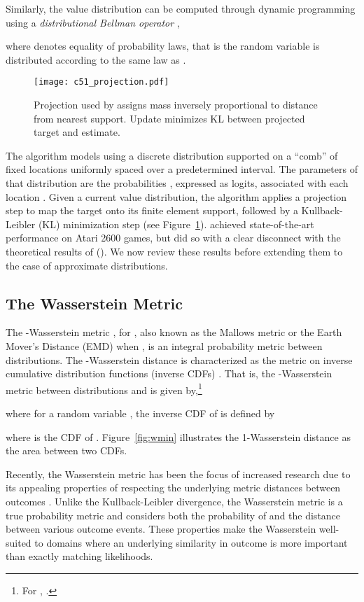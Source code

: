 \documentclass[letterpaper]{article}
\newcommand{\citet}[1]{\citeauthor{#1} (\citeyear{#1})}
\begin{document}
Similarly, the value distribution can be computed through dynamic programming using a \textit{distributional Bellman operator} \cite{c51},

where  denotes equality of probability laws, that is the random variable  is distributed according to the same law as .

\begin{figure}[t]
\begin{center}
\texttt{[image: c51\_projection.pdf]}
\end{center}
\caption{Projection used by  assigns mass inversely proportional to distance from nearest support. Update minimizes KL between projected target and estimate.\label{fig:c51proj}}
\end{figure}

The  algorithm models  using a discrete distribution supported on a ``comb'' of fixed locations  uniformly spaced over a predetermined interval. The parameters of that distribution are the probabilities , expressed as logits, associated with each location . Given a current value distribution, the  algorithm applies a projection step  to map the target  onto its finite element support, followed by a Kullback-Leibler (KL) minimization step (see Figure~\ref{fig:c51proj}).  achieved state-of-the-art performance on Atari 2600 games, but did so with a clear disconnect with the theoretical results of \citet{c51}. We now review these results before extending them to the case of approximate distributions.

\subsection{The Wasserstein Metric}

The -Wasserstein metric , for , also known as the Mallows metric \cite{bickel81asymptotic} or the Earth Mover's Distance (EMD) when  \cite{levina2001earth}, is an integral probability metric between distributions.
The -Wasserstein distance is characterized as the  metric on inverse cumulative distribution functions (inverse CDFs) \cite{muller1997integral}. That is, the -Wasserstein metric between distributions  and  is given by,\footnote{For , .}

where for a random variable , the inverse CDF  of  is defined by

where  is the CDF of . Figure~\ref{fig:wmin} illustrates the 1-Wasserstein distance as the area between two CDFs.

Recently, the Wasserstein metric has been the focus of increased research due to its appealing properties of respecting the underlying metric distances between outcomes \cite{wgan,bellemare17cramer}. 
Unlike the Kullback-Leibler divergence, the Wasserstein metric is a true probability metric and considers both the probability of and the distance between various outcome events. These properties make the Wasserstein well-suited to domains where an underlying similarity in outcome is more important than exactly matching likelihoods.
\end{document}
